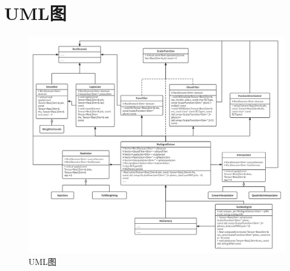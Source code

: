 \documentclass[a4paper,twoside]{ctexart}
\begin{document}
\section{UML图}
\begin{figure}[!htp]                                                                       
  \centering                                                                           
  \includegraphics[width=16cm]{Multigrid2.png}                                           
  \caption{UML图}                        
\end{figure}
\end{document}
